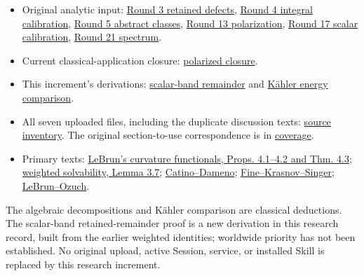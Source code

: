 \documentclass[
  11pt,
]{article}
\providecommand{\tightlist}{%
  \setlength{\itemsep}{0pt}\setlength{\parskip}{0pt}}
\begin{document}
\begin{itemize}
\tightlist
\item
  Original analytic input: \href{round3_monopole_input.md}{Round 3
  retained defects}, \href{round4_rigidity.md}{Round 4 integral
  calibration}, \href{round5_rigidity.md}{Round 5 abstract classes},
  \href{round13_chamber.md}{Round 13 polarization},
  \href{round17_integral.md}{Round 17 scalar calibration},
  \href{round21_analytic.md}{Round 21 spectrum}.
\item
  Current classical-application closure:
  \href{lebrun_stability_closure.md}{polarized closure}.
\item
  This increment's derivations:
  \href{line1_scalar_band_remainder.md}{scalar-band remainder} and
  \href{line1_kahler_energy.md}{Kähler energy comparison}.
\item
  All seven uploaded files, including the duplicate discussion texts:
  \href{line1_sources_20260923/manifest.json}{source inventory}. The
  original section-to-use correspondence is in
  \href{line1_source_coverage.tsv}{coverage}.
\item
  Primary texts: \href{https://arxiv.org/html/math/0003068}{LeBrun's
  curvature functionals, Props. 4.1--4.2 and Thm. 4.3};
  \href{https://arxiv.org/html/math/0611450}{weighted solvability, Lemma
  3.7}; \href{https://arxiv.org/html/2607.21538v1}{Catino--Dameno};
  \href{https://arxiv.org/abs/1910.09790}{Fine--Krasnov--Singer};
  \href{https://arxiv.org/html/2601.19215v2}{LeBrun--Ozuch}.
\end{itemize}

The algebraic decompositions and Kähler comparison are classical
deductions. The scalar-band retained-remainder proof is a new derivation
in this research record, built from the earlier weighted identities;
worldwide priority has not been established. No original upload, active
Session, service, or installed Skill is replaced by this research
increment.
\end{document}
